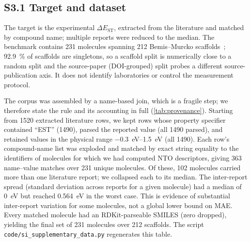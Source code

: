 \documentclass[final,3p,times,twocolumn]{elsarticle}
\begin{document}
\subsection*{S3.1 Target and dataset}
The target is the experimental $\Delta E_\text{ST}$, extracted from the
literature and matched by compound name; multiple reports were reduced to the
median. The benchmark contains \num{231} molecules spanning \num{212}
Bemis--Murcko scaffolds~\cite{Bemis1996}; \qty{92.9}{\percent} of scaffolds are
singletons, so a scaffold split is numerically close to a random split and the
source-paper (DOI-grouped) split probes a different source-publication axis.
It does not identify laboratories or control the measurement protocol.

The corpus was assembled by a name-based join, which is a fragile step; we therefore
state the rule and its accounting in full (\cref{tab:provenance}). Starting from
\num{1520} extracted literature rows, we kept rows whose property specifier
contained ``EST'' (\num{1490}), parsed the reported value (all \num{1490} parsed),
and retained values in the physical range \qtyrange{-0.3}{1.5}{\electronvolt} (all \num{1490}). Each
row's compound-name list was exploded and matched by exact string equality to the
identifiers of molecules for which we had computed NTO descriptors, giving
\num{363} name--value matches over \num{231} unique molecules. Of these,
\num{102} molecules carried more than one literature report; we collapsed each to
its median. The inter-report spread (standard deviation across reports for a given
molecule) had a median of \qty{0}{\electronvolt} but reached
\qty{0.564}{\electronvolt} in the worst case. This is evidence of substantial
inter-report variation for some molecules, not a global lower bound on MAE. Every matched molecule had an RDKit-parseable SMILES (zero dropped),
yielding the final set of \num{231} molecules over \num{212} scaffolds. The script
\texttt{code/si\_supplementary\_data.py} regenerates this table.
\end{document}
